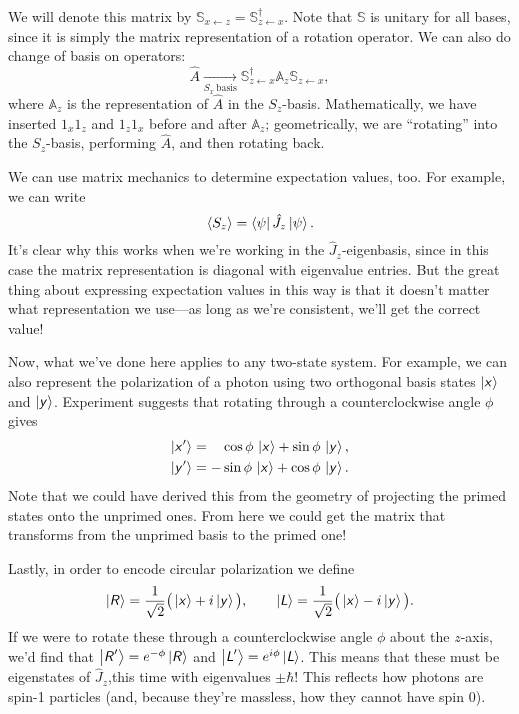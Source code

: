 \documentclass[../p116main.tex]{subfiles}
\begin{document}
We will denote this matrix by $\mathbb S_{x \leftarrow z} = \mathbb S_{z \leftarrow x}^\dagger$.
Note that $\mathbb S$ is unitary for all bases, since it is simply the matrix representation of a rotation operator.
We can also do change of basis on operators:
\[ \hat A \xrightarrow[{S_x \,\textrm{basis}}]{} \mathbb S_{z \leftarrow x}^\dagger \mathbb A_z \mathbb S_{z \leftarrow x}, \]
where $\mathbb A_z$ is the representation of $\hat A$ in the $S_z$-basis.
Mathematically, we have inserted $1_x 1_z$ and $1_z 1_x$ before and after $\mathbb A_{z}$; geometrically, we are ``rotating'' into the $S_z$-basis, performing $\hat A$, and then rotating back.

We can use matrix mechanics to determine expectation values, too.
For example, we can write
\[ \left< S_z \right> = \left< \psi \right| \hat J_z \left| \psi \right>. \]
It's clear why this works when we're working in the $\hat J_z$-eigenbasis, since in this case the matrix representation is diagonal with eigenvalue entries.
But the great thing about expressing expectation values in this way is that it doesn't matter what representation we use---as long as we're consistent, we'll get the correct value!

Now, what we've done here applies to any two-state system.
For example, we can also represent the polarization of a photon using two orthogonal basis states $\left| \textsf{\textit{x}} \right>$ and $\left| \textsf{\textit{y}} \right>$.
Experiment suggests that rotating through a counterclockwise angle $\phi$ gives \vspace{-10pt}
\begin{align*}
    \left| \textsf{\textit{x}}' \right> &= \phantom{-}\cos \phi \, \left| \textsf{\textit{x}} \right> + \sin \phi \, \left| \textsf{\textit{y}} \right>, \\
    \left| \textsf{\textit{y}}' \right> &= -\sin \phi \, \left| \textsf{\textit{x}} \right> + \cos \phi \, \left| \textsf{\textit{y}} \right>.
\end{align*}
Note that we could have derived this from the geometry of projecting the primed states onto the unprimed ones.
From here we could get the matrix that transforms from the unprimed basis to the primed one!

\pagebreak

Lastly, in order to encode circular polarization we define
\[ \left| \textsf{\textit{R}} \right> = \frac{1}{\sqrt{2}} \big( \left| \textsf{\textit{x}} \right> + i \left| \textsf{\textit{y}} \right> \big), \qquad \left| \textsf{\textit{L}} \right> = \frac{1}{\sqrt{2}} \big( \left| \textsf{\textit{x}} \right> - i \left| \textsf{\textit{y}} \right> \big). \]
If we were to rotate these through a counterclockwise angle $\phi$ about the $z$-axis, we'd find that $\left| \textsf{\textit{R}}' \right> = e^{-\phi} \left| \textsf{\textit{R}} \right>$ and $\left| \textsf{\textit{L}}' \right> = e^{i\phi} \left| \textsf{\textit{L}} \right>$.
This means that these must be eigenstates of $\hat J_z$,this time with eigenvalues $\pm \hbar$!
This reflects how photons are spin-1 particles (and, because they're massless, how they cannot have spin 0).
\end{document}
